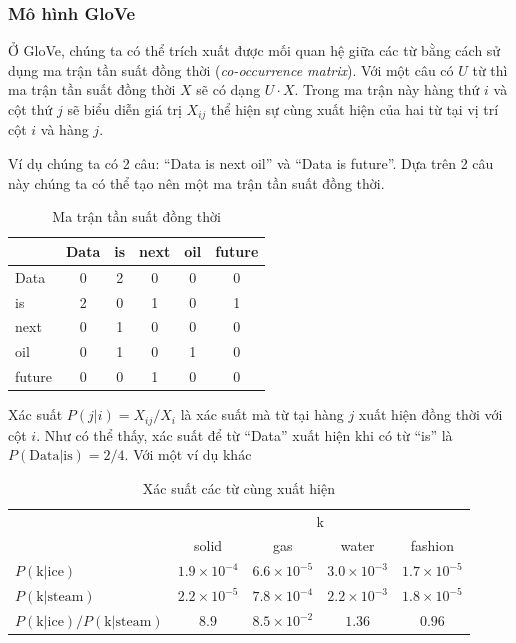 \subsubsection{Mô hình GloVe}
Ở GloVe, chúng ta có thể trích xuất được mối quan hệ giữa các từ bằng cách sử dụng ma trận tần suất đồng thời (\textit{co-occurrence matrix}). Với một câu có $U$ từ thì ma trận tần suất đồng thời $X$ sẽ có dạng $U\cdot X$. Trong ma trận này hàng thứ $i$ và cột thứ $j$ sẽ biểu diễn giá trị $X_{ij}$ thể hiện sự cùng xuất hiện của hai từ tại vị trí cột $i$ và hàng $j$.

Ví dụ chúng ta có 2 câu: ``Data is next oil'' và ``Data is future''. Dựa trên 2 câu này chúng ta có thể tạo nên một ma trận tần suất đồng thời.
\begin{table}[htb]
    \centering
    \caption[Ma trận tần suất đồng thời]{Ma trận tần suất đồng thời \cite{webpage9}}
    \label{table:frequency-matrix}
    \begin{tabular}{ l c c c c c }
        \toprule
               & Data & is & next & oil & future \\\midrule
        Data   & 0    & 2  & 0    & 0   & 0      \\
        is     & 2    & 0  & 1    & 0   & 1      \\
        next   & 0    & 1  & 0    & 0   & 0      \\
        oil    & 0    & 1  & 0    & 1   & 0      \\
        future & 0    & 0  & 1    & 0   & 0      \\
        \bottomrule
    \end{tabular}
\end{table}

Xác suất $P(j|i) = X_{ij}/X_i$ là xác suất mà từ tại hàng $j$ xuất hiện đồng thời với cột $i$. Như có thể thấy, xác suất để từ ``Data'' xuất hiện khi có từ ``is'' là $P(\text{Data|is}) = 2/4$. Với một ví dụ khác
\begin{table}[htb]
    \centering
    \caption[Xác suất các từ cùng xuất hiện]{Xác suất các từ cùng xuất hiện \cite{webpage9}}
    \begin{tabular}{ l c c c c }
        \toprule
                                            & \multicolumn{4}{c}{k}                                                                   \\\cmidrule{2-5}
                                            & solid                 & gas                 & water               & fashion             \\\midrule
        $P(\text{k|ice})$                   & $1.9\times 10^{-4}$   & $6.6\times 10^{-5}$ & $3.0\times 10^{-3}$ & $1.7\times 10^{-5}$ \\
        $P(\text{k|steam})$                 & $2.2\times 10^{-5}$   & $7.8\times 10^{-4}$ & $2.2\times 10^{-3}$ & $1.8\times 10^{-5}$ \\
        $P(\text{k|ice})/P(\text{k|steam})$ & $8.9$                 & $8.5\times 10^{-2}$ & $1.36$              & $0.96$              \\
        \bottomrule
    \end{tabular}
\end{table}

